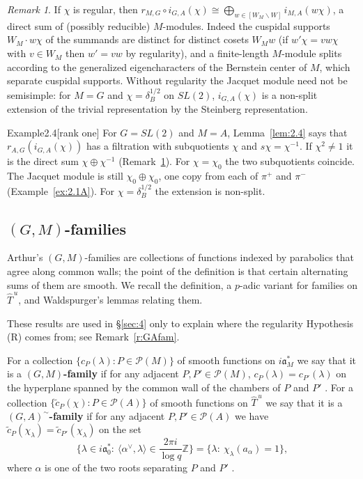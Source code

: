\documentclass[12pt,letterpaper]{article}
\numberwithin{equation}{section}
\theoremstyle{plain}
\theoremstyle{remark}
\newtheorem{remarkold}{Remark}%
\theoremstyle{plain}
\theoremstyle{definition}
\theoremstyle{remark}
\theoremstyle{remark}
\newcommand{\cP}{\mathcal{P}}
\newcommand{\fa}{\mathfrak{a}}
\newcommand{\ip}[1]{\langle #1\rangle}
\newcommand{\Thu}{\widehat{T}^{\,u}}
\newcommand{\Wrep}[1]{[W_{#1}\backslash W]}
\begin{document}
\begin{remarkold}\label{rem:1}
If $\chi$ is regular, then $r_{M,G}\circ i_{G,A}(\chi)\cong\bigoplus_{w\in\Wrep{M}}i_{M,A}(w\chi)$, a direct sum of (possibly reducible) $M$-modules. Indeed the cuspidal supports $W_M\cdot w\chi$ of the summands are distinct for distinct cosets $W_Mw$ (if $w'\chi=vw\chi$ with $v\in W_M$ then $w'=vw$ by regularity), and a finite-length $M$-module splits according to the generalized eigencharacters of the Bernstein center of $M$, which separate cuspidal supports. Without regularity the Jacquet module need not be semisimple: for $M=G$ and $\chi=\delta_B^{1/2}$ on $SL(2)$, $i_{G,A}(\chi)$ is a non-split extension of the trivial representation by the Steinberg representation.
\end{remarkold}

\begin{fixedrem}{Example}{2.4}[rank one]\label{ex:2.4}
For $G=SL(2)$ and $M=A$, Lemma~\ref{lem:2.4} says that $r_{A,G}(i_{G,A}(\chi))$ has a filtration with subquotients $\chi$ and $s\chi=\chi^{-1}$. If $\chi^2\ne1$ it is the direct sum $\chi\oplus\chi^{-1}$ (Remark~\ref{rem:1}). For $\chi=\chi_0$ the two subquotients coincide. The Jacquet module is still $\chi_0\oplus\chi_0$, one copy from each of $\pi^+$ and $\pi^-$ (Example~\ref{ex:2.1A}). For $\chi=\delta_B^{1/2}$ the extension is non-split.
\end{fixedrem}

\subsection{\texorpdfstring{$(G,M)$}{(G,M)}-families}\label{sec:2.5}

Arthur's $(G,M)$-families are collections of functions indexed by parabolics that agree along common walls; the point of the definition is that certain alternating sums of them are smooth. We recall the definition, a $p$-adic variant for families on $\Thu$, and Waldspurger's lemmas relating them.


These results are used in \S\ref{sec:4} only to explain where the regularity Hypothesis (R) comes from; see Remark~\ref{r:GAfam}.

For a collection $\{c_P(\lambda):P\in\cP(M)\}$ of smooth functions on $i\fa_M^*$ we say that it is a \textbf{$(G,M)$-family} if for any adjacent $P,P'\in\cP(M)$, $c_P(\lambda)=c_{P'}(\lambda)$ on the hyperplane spanned by the common wall of the chambers of $P$ and $P'$ \cite[\S6]{Ar81}. For a collection $\{\tilde c_P(\chi):P\in\cP(A)\}$ of smooth functions on $\Thu$ we say that it is a \textbf{$(G,A)^\sim$-family} if for any adjacent $P,P'\in\cP(A)$ we have $\tilde c_P(\chi_\lambda)=\tilde c_{P'}(\chi_\lambda)$ on the set
\[
\Big\{\lambda\in i\fa_0^*:\ \ip{\alpha^\vee,\lambda}\in\frac{2\pi i}{\log q}\mathbb{Z}\Big\}=\{\lambda:\ \chi_\lambda(a_\alpha)=1\},
\]
where $\alpha$ is one of the two roots separating $P$ and $P'$ \cite[p.~26]{Wa89a}.
\end{document}
